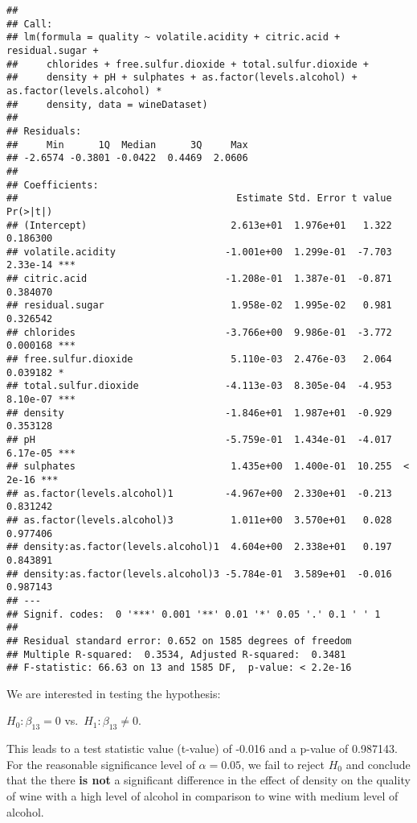 \documentclass[
]{article}
\begin{document}
\begin{verbatim}
## 
## Call:
## lm(formula = quality ~ volatile.acidity + citric.acid + residual.sugar + 
##     chlorides + free.sulfur.dioxide + total.sulfur.dioxide + 
##     density + pH + sulphates + as.factor(levels.alcohol) + as.factor(levels.alcohol) * 
##     density, data = wineDataset)
## 
## Residuals:
##     Min      1Q  Median      3Q     Max 
## -2.6574 -0.3801 -0.0422  0.4469  2.0606 
## 
## Coefficients:
##                                      Estimate Std. Error t value Pr(>|t|)    
## (Intercept)                         2.613e+01  1.976e+01   1.322 0.186300    
## volatile.acidity                   -1.001e+00  1.299e-01  -7.703 2.33e-14 ***
## citric.acid                        -1.208e-01  1.387e-01  -0.871 0.384070    
## residual.sugar                      1.958e-02  1.995e-02   0.981 0.326542    
## chlorides                          -3.766e+00  9.986e-01  -3.772 0.000168 ***
## free.sulfur.dioxide                 5.110e-03  2.476e-03   2.064 0.039182 *  
## total.sulfur.dioxide               -4.113e-03  8.305e-04  -4.953 8.10e-07 ***
## density                            -1.846e+01  1.987e+01  -0.929 0.353128    
## pH                                 -5.759e-01  1.434e-01  -4.017 6.17e-05 ***
## sulphates                           1.435e+00  1.400e-01  10.255  < 2e-16 ***
## as.factor(levels.alcohol)1         -4.967e+00  2.330e+01  -0.213 0.831242    
## as.factor(levels.alcohol)3          1.011e+00  3.570e+01   0.028 0.977406    
## density:as.factor(levels.alcohol)1  4.604e+00  2.338e+01   0.197 0.843891    
## density:as.factor(levels.alcohol)3 -5.784e-01  3.589e+01  -0.016 0.987143    
## ---
## Signif. codes:  0 '***' 0.001 '**' 0.01 '*' 0.05 '.' 0.1 ' ' 1
## 
## Residual standard error: 0.652 on 1585 degrees of freedom
## Multiple R-squared:  0.3534, Adjusted R-squared:  0.3481 
## F-statistic: 66.63 on 13 and 1585 DF,  p-value: < 2.2e-16
\end{verbatim}

We are interested in testing the hypothesis:

\(H_0: \beta_{13} =0\) vs.~\(H_1: \beta_{13} \neq 0\).

This leads to a test statistic value (t-value) of -0.016 and a p-value
of 0.987143. For the reasonable significance level of \(\alpha=0.05\),
we fail to reject \(H_0\) and conclude that the there \textbf{is not} a
significant difference in the effect of density on the quality of wine
with a high level of alcohol in comparison to wine with medium level of
alcohol.
\end{document}
